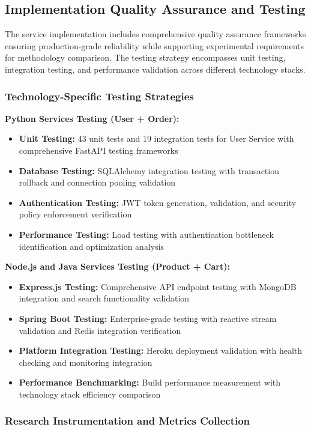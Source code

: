 \subsection{Implementation Quality Assurance and Testing}

The service implementation includes comprehensive quality assurance frameworks ensuring production-grade reliability while supporting experimental requirements for methodology comparison. The testing strategy encompasses unit testing, integration testing, and performance validation across different technology stacks.

\subsubsection{Technology-Specific Testing Strategies}

\textbf{Python Services Testing (User + Order):}
\begin{itemize}
\item \textbf{Unit Testing:} 43 unit tests and 19 integration tests for User Service with comprehensive FastAPI testing frameworks
\item \textbf{Database Testing:} SQLAlchemy integration testing with transaction rollback and connection pooling validation
\item \textbf{Authentication Testing:} JWT token generation, validation, and security policy enforcement verification
\item \textbf{Performance Testing:} Load testing with authentication bottleneck identification and optimization analysis
\end{itemize}

\textbf{Node.js and Java Services Testing (Product + Cart):}
\begin{itemize}
\item \textbf{Express.js Testing:} Comprehensive API endpoint testing with MongoDB integration and search functionality validation
\item \textbf{Spring Boot Testing:} Enterprise-grade testing with reactive stream validation and Redis integration verification
\item \textbf{Platform Integration Testing:} Heroku deployment validation with health checking and monitoring integration
\item \textbf{Performance Benchmarking:} Build performance measurement with technology stack efficiency comparison
\end{itemize}

\subsubsection{Research Instrumentation and Metrics Collection}

